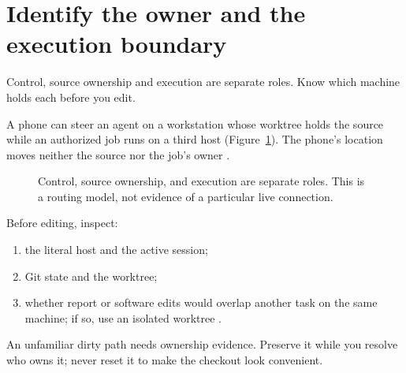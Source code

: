 \section{Identify the owner and the execution boundary}

\begin{headline}
  Control, source ownership and execution are separate roles. Know which machine holds
  each before you edit.
\end{headline}

A phone can steer an agent on a workstation whose worktree holds the source while an
authorized job runs on a third host (Figure~\ref{fig:roles}). The phone's location moves
neither the source nor the job's owner \cite[GUI, terminal and cross-client
  sessions]{skill:workflow-gui}.

\begin{figure}[H]
  \centering
  \caption{Control, source ownership, and execution are separate roles. This is a
    routing model, not evidence of a particular live connection.}
  \label{fig:roles}
\end{figure}

Before editing, inspect:
\begin{enumerate}
  \item the literal host and the active session;
  \item Git state and the worktree;
  \item whether report or software edits would overlap another task on the same machine; if so,
        use an isolated worktree \cite[Start a writing task; Commit and hand off]{skill:git}.
\end{enumerate}

\begin{rulebox}
  An unfamiliar dirty path needs ownership evidence. Preserve it while you resolve who owns
  it; never reset it to make the checkout look convenient.
\end{rulebox}

